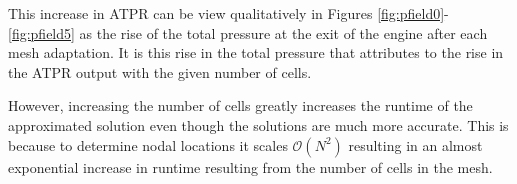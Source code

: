 This increase in ATPR can be view qualitatively in Figures \ref{fig:pfield0}-\ref{fig:pfield5} as the rise of the total pressure at the exit of the engine after each mesh adaptation. It is this rise in the total pressure that attributes to the rise in the ATPR output with the given number of cells.

However, increasing the number of cells greatly increases the runtime of the approximated solution even though the solutions are much more accurate. This is because to determine nodal locations it scales $\mathcal{O}(N^2)$ resulting in an almost exponential increase in runtime resulting from the number of cells in the mesh.

